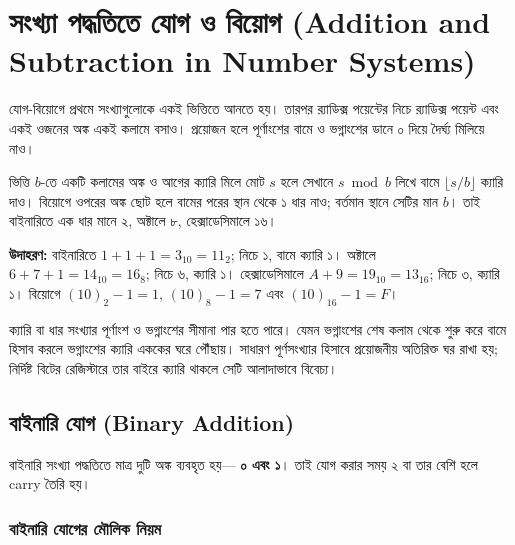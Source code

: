 
\section{সংখ্যা পদ্ধতিতে যোগ ও বিয়োগ
(\textenglish{Addition and Subtraction in Number Systems})}

যোগ-বিয়োগে প্রথমে সংখ্যাগুলোকে একই ভিত্তিতে আনতে হয়। তারপর র‍্যাডিক্স পয়েন্টের নিচে র‍্যাডিক্স পয়েন্ট এবং একই ওজনের অঙ্ক একই কলামে বসাও। প্রয়োজন হলে পূর্ণাংশের বামে ও ভগ্নাংশের ডানে ০ দিয়ে দৈর্ঘ্য মিলিয়ে নাও।

ভিত্তি $b$-তে একটি কলামের অঙ্ক ও আগের ক্যারি মিলে মোট $s$ হলে সেখানে $s\bmod b$ লিখে বামে $\lfloor s/b\rfloor$ ক্যারি দাও। বিয়োগে ওপরের অঙ্ক ছোট হলে বামের পরের স্থান থেকে ১ ধার নাও; বর্তমান স্থানে সেটির মান $b$। তাই বাইনারিতে এক ধার মানে ২, অক্টালে ৮, হেক্সাডেসিমালে ১৬।

\textbf{উদাহরণ:} বাইনারিতে $1+1+1=3_{10}=11_2$; নিচে ১, বামে ক্যারি ১। অক্টালে $6+7+1=14_{10}=16_8$; নিচে ৬, ক্যারি ১। হেক্সাডেসিমালে $A+9=19_{10}=13_{16}$; নিচে ৩, ক্যারি ১। বিয়োগে $(10)_2-1=1$, $(10)_8-1=7$ এবং $(10)_{16}-1=F$।

ক্যারি বা ধার সংখ্যার পূর্ণাংশ ও ভগ্নাংশের সীমানা পার হতে পারে। যেমন ভগ্নাংশের শেষ কলাম থেকে শুরু করে বামে হিসাব করলে ভগ্নাংশের ক্যারি এককের ঘরে পৌঁছায়। সাধারণ পূর্ণসংখ্যার হিসাবে প্রয়োজনীয় অতিরিক্ত ঘর রাখা হয়; নির্দিষ্ট বিটের রেজিস্টারে তার বাইরে ক্যারি থাকলে সেটি আলাদাভাবে বিবেচ্য।


\subsection{বাইনারি যোগ
(\textenglish{Binary Addition})}

বাইনারি সংখ্যা পদ্ধতিতে মাত্র দুটি অঙ্ক ব্যবহৃত হয়—
\textbf{০ এবং ১}।
তাই যোগ করার সময় ২ বা তার বেশি হলে
\textenglish{carry} তৈরি হয়।

\subsubsection*{বাইনারি যোগের মৌলিক নিয়ম}

